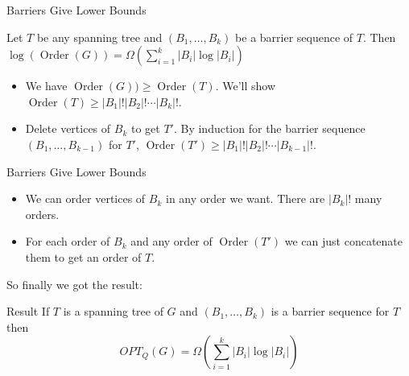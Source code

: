 \documentclass[10pt]{beamer}
\DeclareMathOperator{\order}{Order}
\begin{document}
\begin{frame}{Barriers Give Lower Bounds}
	\begin{theorem}
		Let $T$ be any spanning tree and $(B_1,\dots, B_k)$ be a barrier sequence of $T$. Then $\log(\order(G))=\Omega\left(\sum\limits_{i=1}^k|B_i|\log|B_i|\right)$
	\end{theorem}\vfill \pause 

	\begin{itemize}
		\item We have $\order(G))\geq \order(T)$. We'll show $\order(T)\geq |B_1|!|B_2|!\cdots|B_k|!$.\pause \vfill
		\item Delete vertices of $B_k$ to get $T'$. By induction for the barrier sequence $(B_1,\dots, B_{k-1})$ for $T'$, $\order(T')\geq |B_1|!|B_2|!\cdots|B_{k-1}|!$.
	\end{itemize}
\end{frame}

\begin{frame}{Barriers Give Lower Bounds}

	\begin{itemize}
		\item We can order vertices of $B_k$ in any order we want. There are $|B_k|!$ many orders. \pause 
		\item For each order of $B_k$ and any order of $\order(T')$ we can just concatenate them to get an order of $T$.\pause 
	\end{itemize}
	\vfill

	So finally we got the result:
	\begin{alertblock}{Result}
		If $T$ is a spanning tree of $G$ and $(B_1,\dots, B_k)$ is a barrier sequence for $T$ then $$OPT_Q(G)=\Omega\left(\sum\limits_{i=1}^k|B_i|\log|B_i|\right)$$
	\end{alertblock}
\end{frame}
\end{document}
